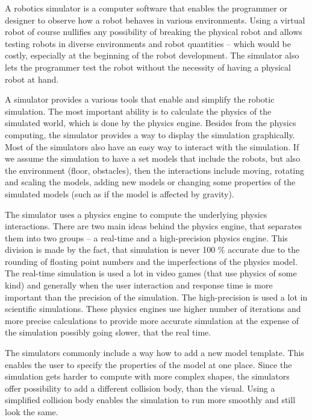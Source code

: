 \documentclass[
  digital, %
  table,   %
  oneside, %
  nolof,     %
  nolot,     %
]{fithesis3}
\begin{document}
A robotics simulator is a computer software that enables the programmer or designer to observe how a robot behaves in various environments.
Using a virtual robot of course nullifies any possibility of breaking the physical robot and allows testing robots in diverse environments and robot quantities -- which would be costly, especially at the beginning of the robot development.
The simulator also lets the programmer test the robot without the necessity of having a physical robot at hand.

A simulator provides a various tools that enable and simplify the robotic simulation.
The most important ability is to calculate the physics of the simulated world, which is done by the physics engine.
Besides from the physics computing, the simulator provides a way to display the simulation graphically.
Most of the simulators also have an easy way to interact with the simulation.
If we assume the simulation to have a set models that include the robots, but also the environment (floor, obstacles), then the interactions include moving, rotating and scaling the models, adding new models or changing some properties of the simulated models (such as if the model is affected by gravity).

The simulator uses a physics engine to compute the underlying physics interactions.
There are two main ideas behind the physics engine, that separates them into two groups -- a real-time and a high-precision physics engine.
This division is made by the fact, that simulation is never 100 \% accurate due to the rounding of floating point numbers and the imperfections of the physics model.
The real-time simulation is used a lot in video games (that use physics of some kind) and generally when the user interaction and response time is more important than the precision of the simulation.
The high-precision is used a lot in scientific simulations.
These physics engines use higher number of iterations and more precise calculations to provide more accurate simulation at the expense of the simulation possibly going slower, that the real time.

The simulators commonly include a way how to add a new model template.
This enables the user to specify the properties of the model at one place.
Since the simulation gets harder to compute with more complex shapes, the simulators offer possibility to add a different collision body, than the visual.
Using a simplified collision body enables the simulation to run more smoothly and still look the same.
\end{document}
